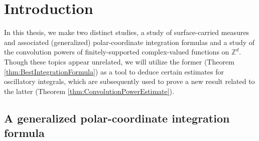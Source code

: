 \documentclass[11pt, letter]{book}
\begin{document}
\tableofcontents





\chapter{Introduction}\label{chap:intro}


In this thesis, we make two distinct studies, a study of surface-carried measures and associated (generalized) polar-coordinate integration formulas and a study of the convolution powers of finitely-supported complex-valued functions on $\mathbb{Z}^d$.  Though these topics appear unrelated, we will utilize the former (Theorem \ref{thm:BestIntegrationFormula}) as a tool to deduce certain estimates for oscillatory integrals, which are subsequently used to prove a new result related to the latter  (Theorem \ref{thm:ConvolutionPowerEstimate}). 



\section{A generalized polar-coordinate integration formula}
\end{document}
